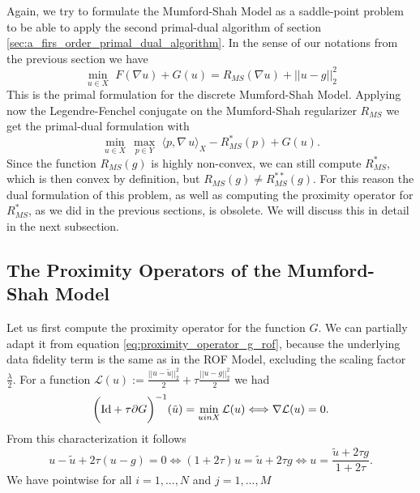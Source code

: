         Again, we try to formulate the Mumford-Shah Model as a saddle-point problem to be able to apply the second primal-dual algorithm of section \ref{sec:a_firs_order_primal_dual_algorithm}. In the sense of our notations from the previous section we have
            \begin{equation}
                \min_{u \in X}\,\, F(\nabla u) + G(u) = R_{MS}(\nabla u) + ||u - g||_{2}^{2}
                \label{eq:primal_mumford_shah_model}
            \end{equation}
        This is the primal formulation for the discrete Mumford-Shah Model. Applying now the Legendre-Fenchel conjugate on the Mumford-Shah regularizer $R_{MS}$ we get the primal-dual formulation with
            \begin{equation}
                \min_{u \in X}\, \max_{p \in Y}\,\, \langle p, \nabla \, u \rangle_{X} - R_{MS}^{\ast}(p) + G(u).
            \label{eq:primal_dual_mumford_shah_model}
            \end{equation}
        Since the function $R_{MS}(g)$ is highly non-convex, we can still compute $R^{\ast}_{MS}$, which is then convex by definition, but $R_{MS}(g) \neq R^{\ast\ast}_{MS}(g)$. For this reason the dual formulation of this problem, as well as computing the proximity operator for $R^{\ast}_{MS}$, as we did in the previous sections, is obsolete. We will discuss this in detail in the next subsection.


    \subsection{The Proximity Operators of the Mumford-Shah Model} %
    \label{sub:the_proximity_operators_of_the_mumford_shah_model}
        
        Let us first compute the proximity operator for the function $G$. We can partially adapt it from equation \ref{eq:proximity_operator_g_rof}, because the underlying data fidelity term is the same as in the ROF Model, excluding the scaling factor $\frac{\lambda}{2}$. For a function $\mathcal{L}(u) := \frac{||u - \tilde{u}||_{2}^{2}}{2} + \tau \frac{||u - g||_{2}^{2}}{2}$ we had
            $$
                \bigg( \textnormal{Id} + \tau \partial G \bigg)^{-1}(\tilde{u}) = \min_{u in X} \mathcal{L}(u) \Longleftrightarrow \nabla \mathcal{L}(u) = 0.
            $$
        From this characterization it follows
            $$
                u - \tilde{u} + 2\tau (u - g) = 0 \Longleftrightarrow (1 + 2\tau)u = \tilde{u} + 2\tau g \Longleftrightarrow u = \frac{\tilde{u} + 2\tau g}{1 + 2\tau}.
            $$
        We have pointwise for all $i = 1, ..., N$ and $j = 1, ..., M$


